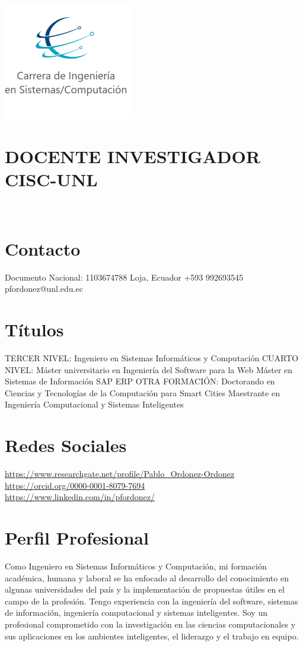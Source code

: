\documentclass[]{cv-style} %
\begin{document}
\begin{aside}
\includegraphics[scale=0.5]{logoCOMP.png}
\section{DOCENTE INVESTIGADOR {CISC-UNL}} %
~
\\
\section{Contacto}
Documento Nacional: 1103674788
Loja, Ecuador
+593 992693545
pfordonez@unl.edu.ec

\section{Títulos}
TERCER NIVEL:
Ingeniero en Sistemas Informáticos y Computación
CUARTO NIVEL:
Máster universitario en Ingeniería del Software para la Web
Máster en Sistemas de Información SAP ERP
OTRA FORMACIÓN:
Doctorando en Ciencias y Tecnologías de la Computación para Smart Cities
Maestrante en Ingeniería Computacional y Sistemas Inteligentes 
~
\section{Redes Sociales}

\small
\url{https://www.researchgate.net/profile/Pablo_Ordonez-Ordonez}
~
\url{https://orcid.org/0000-0001-8079-7694}
~
\url{https://www.linkedin.com/in/pfordonez/}
~


\end{aside}
\small
\section{Perfil Profesional}
  \vspace{-0.3cm}
\small
Como Ingeniero en Sistemas Informáticos y Computación, mi formación académica, humana y laboral se ha enfocado al desarrollo del conocimiento en algunas universidades del país y la implementación de propuestas útiles en el campo de la profesión. Tengo experiencia con la ingeniería del software, sistemas de información, ingeniería computacional y sistemas inteligentes. Soy un profesional comprometido con la investigación en las ciencias computacionales y sus aplicaciones en los ambientes inteligentes, el liderazgo y el trabajo en equipo.
\end{document}
